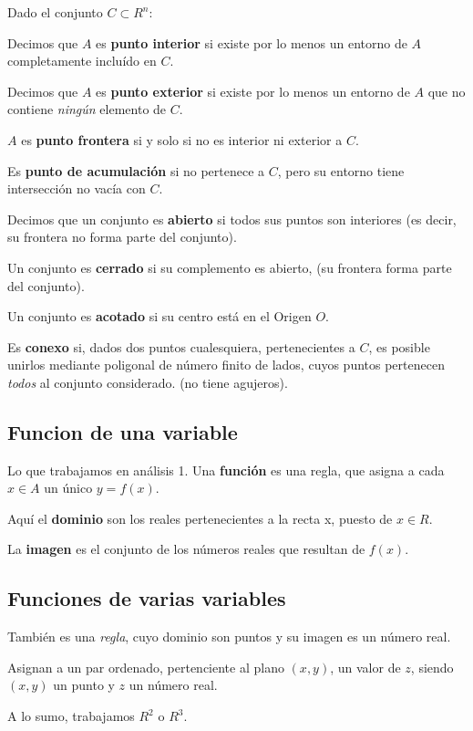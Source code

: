 Dado el conjunto \(C \subset R^{n}\):

Decimos que \(A\) es \textbf{punto interior} si existe por lo menos un entorno de \(A\)
completamente incluído en \(C\).

Decimos que \(A\) es \textbf{punto exterior} si existe por lo menos un entorno de \(A\)
que no contiene \textit{ningún} elemento de \(C\).

\(A\) es \textbf{punto frontera} si y solo si no es interior ni exterior a \(C\).

Es \textbf{punto de acumulación} si no pertenece a \(C\),
pero su entorno tiene intersección no vacía con \(C\).

Decimos que un conjunto es \textbf{abierto} si todos sus puntos son interiores
(es decir, su frontera no forma parte del conjunto).

Un conjunto es \textbf{cerrado} si su complemento es abierto,
(su frontera forma parte del conjunto).

Un conjunto es \textbf{acotado} si su centro está en el Origen \(O\).

Es \textbf{conexo} si, dados dos puntos cualesquiera,
pertenecientes a \(C\),
es posible unirlos mediante poligonal de número finito de lados,
cuyos puntos pertenecen \textit{todos}
al conjunto considerado.
(no tiene agujeros).

\subsection{Funcion de una variable}

Lo que trabajamos en análisis 1.
Una \textbf{función} es una regla, 
que asigna a cada \(x \in A\) un único \(y = f(x)\).

Aquí el \textbf{dominio} son los reales pertenecientes a la recta x,
puesto de \(x \in R\).

La \textbf{imagen} es el conjunto de los números reales que resultan de \(f(x)\).

\subsection{Funciones de varias variables}

También es una \textit{regla},
cuyo dominio son puntos y su imagen es un número real.

Asignan a un par ordenado,
pertenciente al plano \((x,y)\), 
un valor de \(z\),
siendo \((x,y)\) un punto y \(z\) un número real.

A lo sumo, trabajamos \(R^{2}\) o \(R^{3}\).

